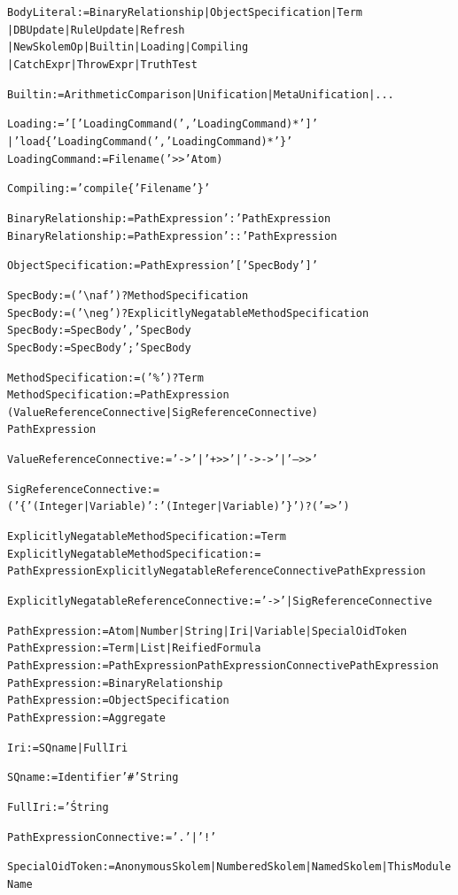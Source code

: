 \documentclass[11pt]{article}
\newcommand{\bs}{\textbackslash}
\newcommand{\RULELOGNAF}{{\texttt{{\bs}naf}}\xspace}
\newcommand{\RULELOGNEG}{{\texttt{{\bs}neg}}\xspace}
\begin{document}
{\begin{alltt}
BodyLiteral := BinaryRelationship | ObjectSpecification | Term
                | DBUpdate | RuleUpdate | Refresh
                | NewSkolemOp | Builtin | Loading | Compiling
                | CatchExpr | ThrowExpr | TruthTest

Builtin := ArithmeticComparison | Unification | MetaUnification | ...

Loading := '[' LoadingCommand (',' LoadingCommand)* ']'
           | 'load\{' LoadingCommand (',' LoadingCommand)* '\}'
LoadingCommand := Filename ('>>' Atom)

Compiling := 'compile\{' Filename '\}'

BinaryRelationship := PathExpression ':' PathExpression
BinaryRelationship := PathExpression '::' PathExpression

ObjectSpecification := PathExpression '[' SpecBody ']'

SpecBody := ('\RULELOGNAF')? MethodSpecification
SpecBody := ('\RULELOGNEG')? ExplicitlyNegatableMethodSpecification
SpecBody := SpecBody ',' SpecBody
SpecBody := SpecBody ';' SpecBody

MethodSpecification :=  ('\%')? Term
MethodSpecification :=  PathExpression
                        (ValueReferenceConnective | SigReferenceConnective)
                        PathExpression

ValueReferenceConnective :=  '->' | '+>>' | '->->' | '-->>'

SigReferenceConnective := ('\{' (Integer|Variable) ':' (Integer|Variable) '\}')? ('=>')

ExplicitlyNegatableMethodSpecification := Term
ExplicitlyNegatableMethodSpecification :=
            PathExpression ExplicitlyNegatableReferenceConnective PathExpression

ExplicitlyNegatableReferenceConnective := '->' | SigReferenceConnective

PathExpression := Atom | Number | String | Iri | Variable | SpecialOidToken
PathExpression := Term | List | ReifiedFormula
PathExpression := PathExpression  PathExpressionConnective PathExpression
PathExpression := BinaryRelationship
PathExpression := ObjectSpecification
PathExpression := Aggregate

Iri := SQname | FullIri

SQname := Identifier '#' String

FullIri := '\'String

PathExpressionConnective :=  '.' | '!'

SpecialOidToken :=  AnonymousSkolem | NumberedSkolem | NamedSkolem | ThisModuleName


\end{alltt}}
\end{document}
